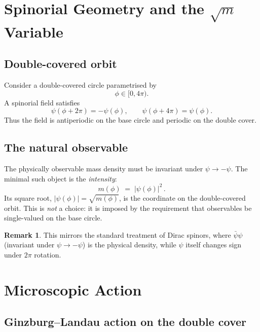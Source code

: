 \documentclass[12pt,a4paper]{article}
\theoremstyle{definition}
\newtheorem{remark}[theorem]{Remark}
\begin{document}
\section{Spinorial Geometry and the \texorpdfstring{$\sqrt{m}$}{sqrt(m)} Variable}
\label{sec:geometry}

\subsection{Double-covered orbit}
Consider a double-covered circle parametrised by
\[
\phi \in [0,4\pi).
\]
A spinorial field satisfies
\begin{equation}
\label{eq:spinor_bc}
\psi(\phi+2\pi)=-\psi(\phi),
\qquad
\psi(\phi+4\pi)=\psi(\phi).
\end{equation}
Thus the field is antiperiodic on the base circle and periodic on the double cover.
\subsection{The natural observable}

The physically observable mass density must be invariant under $\psi \to -\psi$.
The minimal such object is the \emph{intensity}:
\begin{equation}
  \label{eq:m_def}
  m(\phi) \;=\; |\psi(\phi)|^2\,.
\end{equation}
Its square root, $|\psi(\phi)| = \sqrt{m(\phi)}$, is the coordinate on the
double-covered orbit.
This is \emph{not} a choice: it is imposed by the requirement that observables be
single-valued on the base circle.

\begin{remark}
This mirrors the standard treatment of Dirac spinors, where $\bar\psi\psi$ (invariant
under $\psi \to -\psi$) is the physical density, while $\psi$ itself changes sign under
$2\pi$ rotation.
\end{remark}

\section{Microscopic Action}
\label{sec:action}

\subsection{Ginzburg--Landau action on the double cover}
\end{document}
